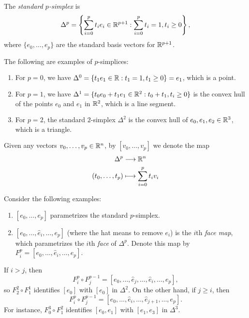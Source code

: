\begin{definition}
  The \emph{standard $p$-simplex} is
  \[
    \Delta^p = \left\{
      \sum_{i = 0}^p t_i e_i \in \mathbb{R}^{p + 1}
      : \sum_{i = 0}^p t_i = 1, t_i \ge 0
    \right\},
  \]
  where $\{e_0, \dots, e_p\}$ are the standard basis
  vectors for $\mathbb{R}^{p + 1}$.
\end{definition}

\begin{example}
  The following are examples of $p$-simplices:
  \begin{enumerate}
    \item For $p = 0$, we have
      $\Delta^0 = \{t_1 e_1 \in \mathbb{R} : t_1 = 1, t_1 \ge 0\} = e_1$,
      which is a point.
    \item For $p = 1$, we have
      $\Delta^1 = \{t_0 e_0 + t_1 e_1 \in \mathbb{R}^2 : t_0 + t_1, t_i \ge 0\}$
      is the convex hull of the points $e_0$ and $e_1$
      in $\mathbb{R}^2$, which is a line segment.
    \item For $p = 2$, the standard $2$-simplex
      $\Delta^2$ is
      the convex hull of $e_0, e_1, e_2 \in \mathbb{R}^3$,
      which is a triangle.
  \end{enumerate}
\end{example}

\begin{definition}
  Given any vectors $v_0, \dots, v_p \in \mathbb{R}^n$, by
  $[v_0, \dots, v_p]$ we denote the map
  \begin{align*}
    \Delta^p &\longrightarrow \mathbb{R}^n \\
    (t_0, \dots, t_p) &\longmapsto \sum_{i = 0}^p t_i v_i
  \end{align*}
\end{definition}

\begin{example}
  Consider the following examples:
  \begin{enumerate}
    \item $[e_0, \dots, e_p]$ parametrizes the
      standard $p$-simplex.
    \item $[e_0, \dots, \widehat{e}_i, \dots, e_p]$
      (where the hat means to remove $e_i$)
      is the $i$th \emph{face map}, which
      parametrizes the $i$th \emph{face} of $\Delta^p$.
      Denote this map by $F_i^p = [e_0, \dots, \widehat{e}_i, \dots, e_p]$.
  \end{enumerate}
\end{example}

\begin{remark}
  If $i > j$, then
  \[
    F_i^p \circ F_j^{p - 1} = [e_0, \dots, \widehat{e}_j, \dots, \widehat{e}_i, \dots, e_p],
  \]
  so $F_2^2 \circ F_1^1$ identifies $[e_0]$ with
  $[e_0]$ in $\Delta^2$.
  On the other hand, if $j \ge i$, then
  \[
    F_i^p \circ F_j^{p - 1} = [e_0, \dots, \widehat{e}_i, \dots, \widehat{e}_{j + 1}, \dots, e_p].
  \]
  For instance, $F_0^3 \circ F_1^2$ identifies
  $[e_0, e_1]$ with $[e_1, e_3]$ in $\Delta^3$.
\end{remark}


